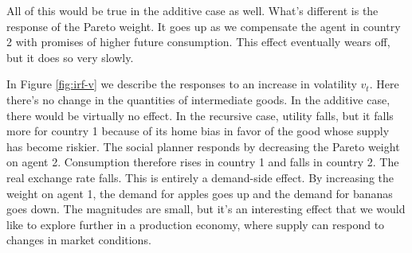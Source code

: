 All of this would be true in the additive case as well.
What's different is the response of the Pareto weight.
It goes up as we compensate the agent in country 2 with promises of higher future consumption.
This effect eventually wears off, but it does so very slowly.


In Figure \ref{fig:irf-v}
we describe the responses to an increase in volatility $v_t$.
Here there's no change in the quantities of intermediate goods.
In the additive case, there would be virtually no effect.
In the recursive case, utility falls, but it falls more for country 1 because
of its home bias in favor of the good whose supply has become riskier.
The social planner responds by decreasing the Pareto weight
on agent 2.
Consumption therefore rises in country 1 and falls in country 2.
The real exchange rate falls.
This is entirely a demand-side effect.
By increasing the weight on agent 1, the demand for apples goes up
and the demand for bananas goes down.
The magnitudes are small, but it's an interesting effect that we would like to explore
further in a production economy, where supply can respond to
changes in market conditions.
